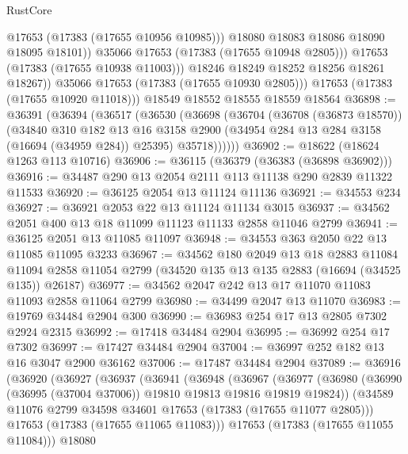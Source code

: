 \begin{lexlean}{RustCore}
\begin{coremodule}
                      @17653
                      (@17383 (@17655 @10956 @10985)))
                    @18080
                    @18083
                    @18086
                    @18090
                    @18095
                    @18101))
                @35066
                @17653
                (@17383 (@17655 @10948 @2805)))
              @17653
              (@17383 (@17655 @10938 @11003)))
            @18246
            @18249
            @18252
            @18256
            @18261
            @18267))
        @35066
        @17653
        (@17383 (@17655 @10930 @2805)))
      @17653
      (@17383 (@17655 @10920 @11018)))
    @18549
    @18552
    @18555
    @18559
    @18564
@36898 := @36391
    (@36394
      (@36517
        (@36530
          (@36698
            (@36704
              (@36708 (@36873 @18570))
              (@34840
                @310
                @182
                @13
                @16
                @3158
                @2900
                (@34954 @284 @13 @284 @3158 (@16694 (@34959 @284)) @25395)
                @35718))))))
@36902 := @18622 (@18624 @1263 @113 @10716)
@36906 := @36115 (@36379 (@36383 (@36898 @36902)))
@36916 := @34487 @290 @13 @2054 @2111 @113 @11138 @290 @2839 @11322 @11533
@36920 := @36125 @2054 @13 @11124 @11136
@36921 := @34553 @234
@36927 := @36921 @2053 @22 @13 @11124 @11134 @3015
@36937 := @34562 @2051 @400 @13 @18 @11099 @11123 @11133 @2858 @11046 @2799
@36941 := @36125 @2051 @13 @11085 @11097
@36948 := @34553 @363 @2050 @22 @13 @11085 @11095 @3233
@36967 := @34562
    @180
    @2049
    @13
    @18
    @2883
    @11084
    @11094
    @2858
    @11054
    @2799
    (@34520 @135 @13 @135 @2883 (@16694 (@34525 @135)) @26187)
@36977 := @34562 @2047 @242 @13 @17 @11070 @11083 @11093 @2858 @11064 @2799
@36980 := @34499 @2047 @13 @11070
@36983 := @19769 @34484 @2904 @300
@36990 := @36983 @254 @17 @13 @2805 @7302 @2924 @2315
@36992 := @17418 @34484 @2904
@36995 := @36992 @254 @17 @7302
@36997 := @17427 @34484 @2904
@37004 := @36997 @252 @182 @13 @16 @3047 @2900 @36162
@37006 := @17487 @34484 @2904
@37089 := @36916
    (@36920
      (@36927
        (@36937
          (@36941
            (@36948
              (@36967
                (@36977
                  (@36980 (@36990 (@36995 (@37004 @37006)) @19810 @19813 @19816 @19819 @19824))
                  (@34589 @11076 @2799 @34598 @34601 @17653 (@17383 (@17655 @11077 @2805)))
                  @17653
                  (@17383 (@17655 @11065 @11083)))
                @17653
                (@17383 (@17655 @11055 @11084)))
              @18080

\end{coremodule}
\end{lexlean}

